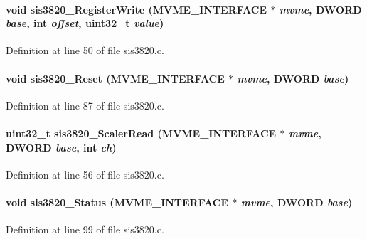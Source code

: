 \paragraph[{sis3820\_\-RegisterWrite}]{\setlength{\rightskip}{0pt plus 5cm}void sis3820\_\-RegisterWrite ({\bf MVME\_\-INTERFACE} $\ast$ {\em mvme}, \/  {\bf DWORD} {\em base}, \/  int {\em offset}, \/  uint32\_\-t {\em value})}\hfill\label{sis3820drv_8h_a1465b6dba20d7efb0409783498376680}


Definition at line 50 of file sis3820.c.
\paragraph[{sis3820\_\-Reset}]{\setlength{\rightskip}{0pt plus 5cm}void sis3820\_\-Reset ({\bf MVME\_\-INTERFACE} $\ast$ {\em mvme}, \/  {\bf DWORD} {\em base})}\hfill\label{sis3820drv_8h_a50fd26e58f02c571c2a6a3bfda4b5946}


Definition at line 87 of file sis3820.c.
\paragraph[{sis3820\_\-ScalerRead}]{\setlength{\rightskip}{0pt plus 5cm}uint32\_\-t sis3820\_\-ScalerRead ({\bf MVME\_\-INTERFACE} $\ast$ {\em mvme}, \/  {\bf DWORD} {\em base}, \/  int {\em ch})}\hfill\label{sis3820drv_8h_aded2977e93622bfb2ef2bd271ea6695f}


Definition at line 56 of file sis3820.c.
\paragraph[{sis3820\_\-Status}]{\setlength{\rightskip}{0pt plus 5cm}void sis3820\_\-Status ({\bf MVME\_\-INTERFACE} $\ast$ {\em mvme}, \/  {\bf DWORD} {\em base})}\hfill\label{sis3820drv_8h_aea6d182191767b9bac21254ef208e9f1}


Definition at line 99 of file sis3820.c.
